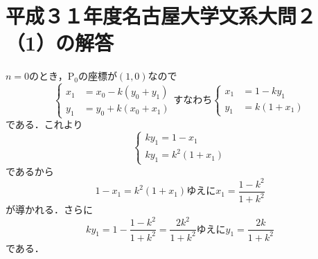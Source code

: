 \documentclass{jsarticle}
\begin{document}
\section{平成３１年度名古屋大学文系大問２（1）の解答}
$n=0$のとき，$\text{P}_0$の座標が$(1,0)$なので
\[
\begin{cases}
x_1&=x_0-k(y_0+y_1) \\
y_1&=y_0+k(x_0+x_1)
\end{cases}
\text{すなわち}
\begin{cases}
x_1&=1-ky_1 \\
y_1&=k(1+x_1)
\end{cases}
\]
である．これより
\[
\begin{cases}
ky_1=1-x_1 \\
ky_1=k^2(1+x_1)
\end{cases}
\]
であるから
\[
1-x_1=k^2(1+x_1)
\text{ゆえに}
x_1=\frac{1-k^2}{1+k^2}
\]
が導かれる．さらに
\[
ky_1=1-\frac{1-k^2}{1+k^2}=\frac{2k^2}{1+k^2}
\text{ゆえに}
y_1=\frac{2k}{1+k^2}
\]
である．
\end{document}

